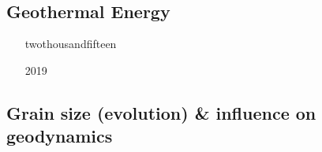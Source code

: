 \begin{scriptsize}
\begin{itemize}
\textcite{lizh15} \\
\item[\twothousandsixteen] 
\textcite{necg16} \\
\item[\twothousandseventeen] 
\textcite{grab17} \\
\textcite{siag17} \\
\item[\twothousandeighteen] 
\textcite{king18} \\
\item[\twothousandtwentytwo]
\textcite{rojy22} \\
\textcite{ghpa22} \\
\textcite{licw22} \\
\end{itemize}
\end{scriptsize}

\subsection{Geothermal Energy} 

\begin{scriptsize}
\begin{itemize}
\item[twothousandfifteen]
\textcite{quxm15}  
\item[2019]
\textcite{revf19} 
\end{itemize}
\end{scriptsize}

\subsection{Grain size (evolution) \& influence on geodynamics}
\label{sec:topics:gsev}

